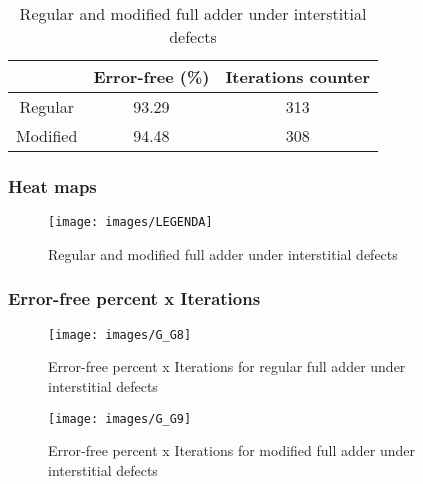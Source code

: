 \begin{table}[h]
\begin{center}
\begin{tabular}{|c|c|c|}
\hline
 & Error-free (\%) & Iterations counter \\
\hline
 Regular & 93.29 & 313 \\
\hline
 Modified & 94.48 & 308 \\
\hline
\end{tabular}
\caption{Regular and modified full adder under interstitial defects}
\end{center}
\end{table}

\pagebreak
\subsubsection{Heat maps}

\begin{figure}[h!]
\center
{}
\linebreak
\hfill
{}
\linebreak
{\texttt{[image: images/LEGENDA]}
}
\caption{Regular and modified full adder under interstitial defects}
\label{figure:full_t4}
\end{figure}

\pagebreak
\subsubsection{Error-free percent x Iterations}

\begin{figure}[h!]
\center
\texttt{[image: images/G\_G8]}
\caption{Error-free percent x Iterations for regular full adder under interstitial defects}
\label{figure:full_reg_gt4}
\end{figure}

\begin{figure}[h!]
\center
\texttt{[image: images/G\_G9]}
\caption{Error-free percent x Iterations for modified full adder under interstitial defects}
\label{figure:full_mod_gt4}
\end{figure}
\pagebreak
